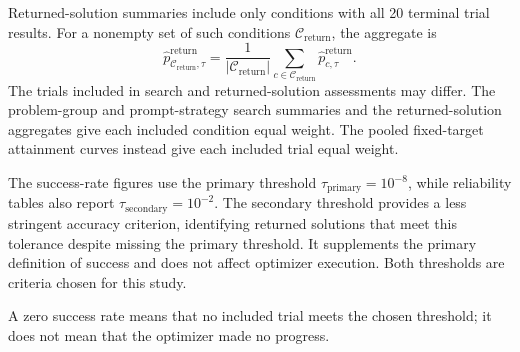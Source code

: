Returned-solution summaries include only conditions with all 20
terminal trial results. For a nonempty set of such conditions
$\mathcal C_{\mathrm{return}}$, the aggregate is
\begin{equation}
    \widehat p_{\mathcal C_{\mathrm{return}},\tau}^{\mathrm{return}}
    =
    \frac{1}{|\mathcal C_{\mathrm{return}}|}
    \sum_{c\in\mathcal C_{\mathrm{return}}}
    \widehat p_{c,\tau}^{\mathrm{return}}.
    \label{eq:benchmark_aggregate_success}
\end{equation}
The trials included in search and returned-solution assessments
may differ. The problem-group and prompt-strategy search summaries
and the returned-solution aggregates give each included condition
equal weight. The pooled fixed-target attainment curves instead
give each included trial equal weight.

The success-rate figures use the primary threshold
$\tau_{\mathrm{primary}}=10^{-8}$, while reliability tables also
report $\tau_{\mathrm{secondary}}=10^{-2}$. The secondary threshold
provides a less stringent accuracy criterion, identifying returned
solutions that meet this tolerance despite missing the primary
threshold. It supplements the primary definition of success and
does not affect optimizer execution. Both thresholds are criteria
chosen for this study.

A zero success rate means that no included trial meets the chosen
threshold; it does not mean that the optimizer made no progress.
